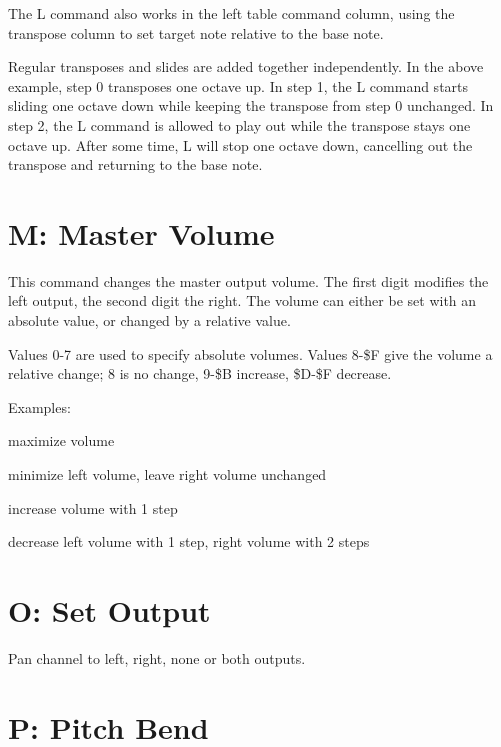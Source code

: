 The L command also works in the left table command column, using the transpose column to set target note relative to the base note.

\begin{figure}[htbp]
	\begin{center}
	\end{center}
\end{figure}

Regular transposes and slides are added together independently. In the above example, step 0 transposes one octave up. In step 1, the L command starts sliding one octave down while keeping the transpose from step 0 unchanged. In step 2, the L command is allowed to play out while the transpose stays one octave up. After some time, L will stop one octave down, cancelling out the transpose and returning to the base note.

\section{M: Master Volume}

This command changes the master output volume. The first digit modifies the left output, the second digit the right. The volume can either be set with an absolute value, or changed by a relative value.

Values 0-7 are used to specify absolute volumes. Values 8-\$F give the volume a relative change; 8 is no change, 9-\$B increase, \$D-\$F decrease.

\begin{description}
\item Examples:
\item[M77] maximize volume
\item[M08] minimize left volume, leave right volume unchanged
\item[M99] increase volume with 1 step
\item[MFE] decrease left volume with 1 step, right volume with 2 steps
\end{description}

\section{O: Set Output}

Pan channel to left, right, none or both outputs.

\section{P: Pitch Bend}


